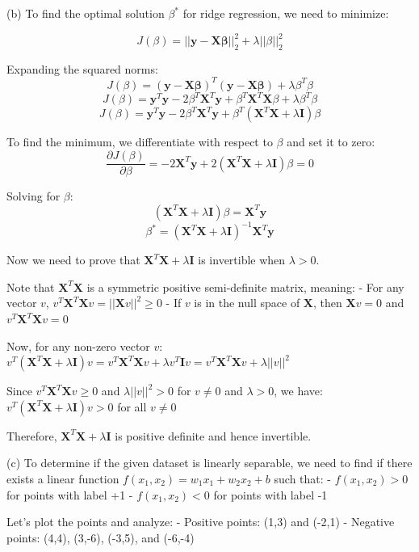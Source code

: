 (b) To find the optimal solution $\beta^*$ for ridge regression, we need to minimize:

$$J(\beta) = ||\mathbf{y}-\mathbf{X}\mathbf{\beta}||_2^2 + \lambda||\beta||_2^2$$

Expanding the squared norms:
$$J(\beta) = (\mathbf{y}-\mathbf{X}\mathbf{\beta})^T(\mathbf{y}-\mathbf{X}\mathbf{\beta}) + \lambda \beta^T \beta$$
$$J(\beta) = \mathbf{y}^T\mathbf{y} - 2\beta^T\mathbf{X}^T\mathbf{y} + \beta^T\mathbf{X}^T\mathbf{X}\beta + \lambda \beta^T \beta$$
$$J(\beta) = \mathbf{y}^T\mathbf{y} - 2\beta^T\mathbf{X}^T\mathbf{y} + \beta^T(\mathbf{X}^T\mathbf{X} + \lambda \mathbf{I})\beta$$

To find the minimum, we differentiate with respect to $\beta$ and set it to zero:
$$\frac{\partial J(\beta)}{\partial \beta} = -2\mathbf{X}^T\mathbf{y} + 2(\mathbf{X}^T\mathbf{X} + \lambda \mathbf{I})\beta = 0$$

Solving for $\beta$:
$$(\mathbf{X}^T\mathbf{X} + \lambda \mathbf{I})\beta = \mathbf{X}^T\mathbf{y}$$
$$\beta^* = (\mathbf{X}^T\mathbf{X} + \lambda \mathbf{I})^{-1}\mathbf{X}^T\mathbf{y}$$

Now we need to prove that $\mathbf{X}^T\mathbf{X} + \lambda \mathbf{I}$ is invertible when $\lambda > 0$.

Note that $\mathbf{X}^T\mathbf{X}$ is a symmetric positive semi-definite matrix, meaning:
- For any vector $v$, $v^T\mathbf{X}^T\mathbf{X}v = ||\mathbf{X}v||^2 \geq 0$
- If $v$ is in the null space of $\mathbf{X}$, then $\mathbf{X}v = 0$ and $v^T\mathbf{X}^T\mathbf{X}v = 0$

Now, for any non-zero vector $v$:
$v^T(\mathbf{X}^T\mathbf{X} + \lambda \mathbf{I})v = v^T\mathbf{X}^T\mathbf{X}v + \lambda v^T\mathbf{I}v = v^T\mathbf{X}^T\mathbf{X}v + \lambda ||v||^2$

Since $v^T\mathbf{X}^T\mathbf{X}v \geq 0$ and $\lambda ||v||^2 > 0$ for $v \neq 0$ and $\lambda > 0$, we have:
$v^T(\mathbf{X}^T\mathbf{X} + \lambda \mathbf{I})v > 0$ for all $v \neq 0$

Therefore, $\mathbf{X}^T\mathbf{X} + \lambda \mathbf{I}$ is positive definite and hence invertible.

(c) To determine if the given dataset is linearly separable, we need to find if there exists a linear function $f(x_1, x_2) = w_1x_1 + w_2x_2 + b$ such that:
- $f(x_1, x_2) > 0$ for points with label +1
- $f(x_1, x_2) < 0$ for points with label -1

Let's plot the points and analyze:
- Positive points: (1,3) and (-2,1)
- Negative points: (4,4), (3,-6), (-3,5), and (-6,-4)


